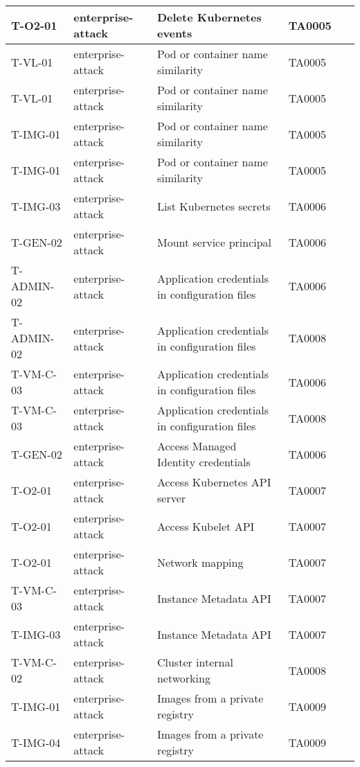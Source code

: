 \begin{table}[!ht]
\begin{longtable}{|l|l|l|l|l|}
        T-O2-01 & enterprise-attack & Delete Kubernetes events & TA0005 & ~ \\ \hline
        T-VL-01 & enterprise-attack & Pod or container name similarity & TA0005 & ~ \\ \hline
        T-VL-01 & enterprise-attack & Pod or container name similarity & TA0005 & ~ \\ \hline
        T-IMG-01 & enterprise-attack & Pod or container name similarity & TA0005 & ~ \\ \hline
        T-IMG-01 & enterprise-attack & Pod or container name similarity & TA0005 & ~ \\ \hline
        T-IMG-03 & enterprise-attack & List Kubernetes secrets & TA0006 & ~ \\ \hline
        T-GEN-02 & enterprise-attack & Mount service principal & TA0006 & ~ \\ \hline
        T-ADMIN-02 & enterprise-attack & Application credentials in configuration files & TA0006 & ~ \\ \hline
        T-ADMIN-02 & enterprise-attack & Application credentials in configuration files & TA0008 & ~ \\ \hline
        T-VM-C-03 & enterprise-attack & Application credentials in configuration files & TA0006 & ~ \\ \hline
        T-VM-C-03 & enterprise-attack & Application credentials in configuration files & TA0008 & ~ \\ \hline
        T-GEN-02 & enterprise-attack & Access Managed Identity credentials & TA0006 & ~ \\ \hline
        T-O2-01 & enterprise-attack & Access Kubernetes API server & TA0007 & ~ \\ \hline
        T-O2-01 & enterprise-attack & Access Kubelet API & TA0007 & ~ \\ \hline
        T-O2-01 & enterprise-attack & Network mapping & TA0007 & ~ \\ \hline
        T-VM-C-03 & enterprise-attack & Instance Metadata API & TA0007 & ~ \\ \hline
        T-IMG-03 & enterprise-attack & Instance Metadata API & TA0007 & ~ \\ \hline
        T-VM-C-02 & enterprise-attack & Cluster internal networking & TA0008 & ~ \\ \hline
        T-IMG-01 & enterprise-attack & Images from a private registry & TA0009 & ~ \\ \hline
        T-IMG-04 & enterprise-attack & Images from a private registry & TA0009 & ~ \\ \hline

\end{longtable}
\end{table}
